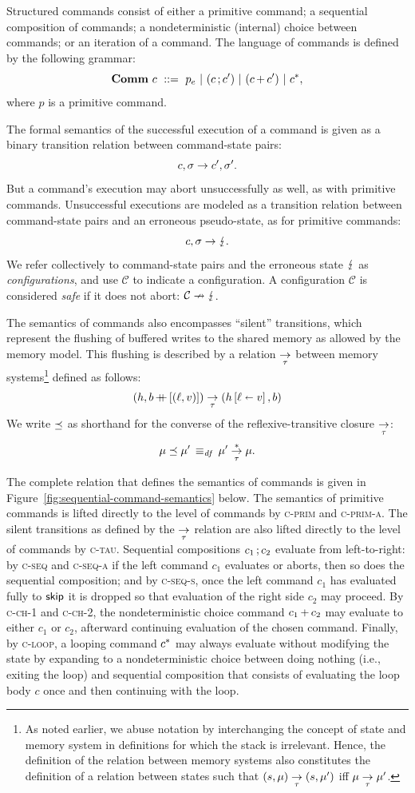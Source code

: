 \documentclass[11pt]{report}         %
\begin{document}
Structured commands consist of either a primitive command; a sequential composition of commands; a nondeterministic (internal) choice between commands; or an iteration of a command. The language of commands is defined by the following grammar: \[ \mathbf{Comm}~c ~::=~ p_e ~|~ (c \operatorname{;} c') ~|~ (c \operatorname{+} c') ~|~ c^{\operatorname{\ast}},\] where $p$ is a primitive command.  

The formal semantics of the successful execution of a command is given as a binary transition relation between command-state pairs: \[ c,\sigma \rightarrow c',\sigma'.\] But a command's execution may abort unsuccessfully as well, as with primitive commands. Unsuccessful executions are modeled as a transition relation between command-state pairs and an erroneous pseudo-state, as for primitive commands: \[ c,\sigma \rightarrow \lightning. \] We refer collectively to command-state pairs and the erroneous state $\lightning$ as \emph{configurations}, and use $\mathcal{C}$ to indicate a configuration. A configuration $\mathcal{C}$ is considered \emph{safe} if it does not abort: $\mathcal{C} \nrightarrow \lightning$.

The semantics of commands also encompasses ``silent'' transitions, which represent the flushing of buffered writes to the shared memory as allowed by the memory model. This flushing is described by a relation $\underset{\tau}{\rightarrow}$ between memory systems\footnote{As noted earlier, we abuse notation by interchanging the concept of state and memory system in definitions for which the stack is irrelevant. Hence, the definition of the relation between memory systems  also constitutes the definition of a relation between states such that $(s,\mu) \underset{\tau}{\rightarrow} (s,\mu')$ iff $\mu \underset{\tau}{\rightarrow} \mu'$.} defined as follows: \begin{align*} (h,b \operatorname{+\!\!\!+} \left[(\ell,v)\right]) \underset{\tau}{\rightarrow} (h \left[ \ell \shortleftarrow v \right],b) 
\end{align*} We write $\preceq$ as shorthand for the converse of the reflexive-transitive closure $\underset{\tau}{\rightarrow}$: \[ \mu \preceq \mu' \operatorname{\;\equiv_{\mathit{df}}\;} \mu' \overset{\ast}{\underset{\tau}{\rightarrow}} \mu.\] 

The complete relation that defines the semantics of commands is given in Figure~\ref{fig:sequential-command-semantics} below. The semantics of primitive commands is lifted directly to the level of commands by \textsc{c-prim} and \textsc{c-prim-a}. The silent transitions as defined by the $\underset{\tau}{\rightarrow}$ relation are also lifted directly to the level of commands by \textsc{c-tau}. Sequential compositions $c_1 \operatorname{;} c_2$ evaluate from left-to-right: by \textsc{c-seq} and \textsc{c-seq-a} if the left command $c_1$ evaluates or aborts, then so does the sequential composition; and by \textsc{c-seq-s}, once the left command $c_1$ has evaluated fully to $\operatorname{\mathsf{skip}}$ it is dropped so that evaluation of the right side $c_2$ may proceed. By \textsc{c-ch-1} and \textsc{c-ch-2}, the nondeterministic choice command $c_1 \operatorname{+} c_2$ may evaluate to either $c_1$ or $c_2$, afterward continuing evaluation of the chosen command. Finally, by \textsc{c-loop}, a looping command $c^{\operatorname{\ast}}$ may always evaluate without modifying the state by expanding to a nondeterministic choice between doing nothing (i.e., exiting the loop) and sequential composition that consists of evaluating the loop body $c$ once and then continuing with the loop. 
\end{document}
